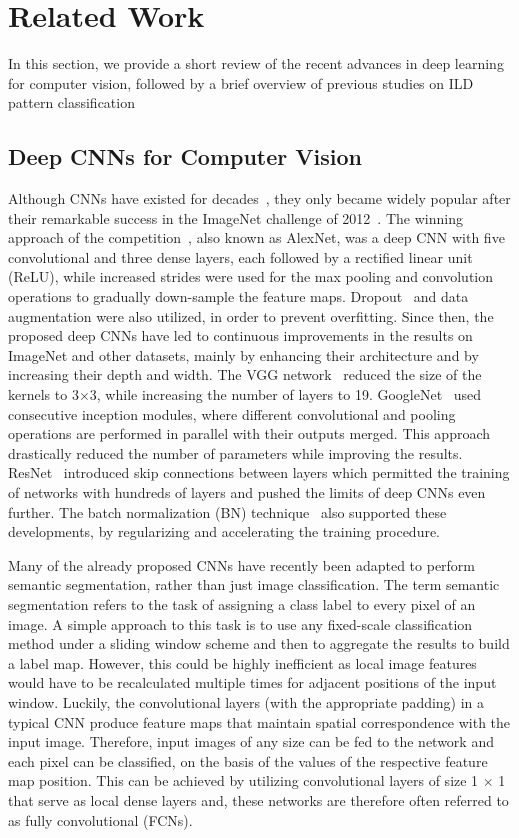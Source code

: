 \documentclass[journal]{IEEEtran}
\begin{document}
\section{Related Work}%
In this section, we provide a short review of the recent advances in deep learning for computer vision, followed by a brief overview of previous studies on ILD pattern classification

\subsection{Deep CNNs for Computer Vision}%
Although CNNs have existed for decades~\cite{lecun98}, they only became widely popular after their remarkable success in the ImageNet challenge of 2012~\cite{ILSVRC15}. The winning approach of the competition~\cite{krizhevsky2012imagenet}, also known as AlexNet, was a deep CNN with five convolutional and three dense layers, each followed by a rectified linear unit (ReLU), while increased strides were used for the max pooling and convolution operations to gradually down-sample the feature maps. Dropout~\cite{Dropout} and data augmentation were also utilized, in order to prevent overfitting. Since then, the proposed deep CNNs have led to continuous improvements in the results on ImageNet and other datasets, mainly by enhancing their architecture and by increasing their depth and width. The VGG network~\cite{simonyan2014very} reduced the size of the kernels to 3$\times$3, while increasing the number of layers to 19. GoogleNet~\cite{szegedy2015going} used consecutive inception modules, where different convolutional and pooling operations are performed in parallel with their outputs merged. This approach drastically reduced the number of parameters while improving the results. ResNet~\cite{he2016deep} introduced skip connections between layers which permitted the training of networks with hundreds of layers and pushed the limits of deep CNNs even further. The batch normalization (BN) technique~\cite{IoffeBN} also supported these developments, by regularizing and accelerating the training procedure.

Many of the already proposed CNNs have recently been adapted to perform semantic segmentation, rather than just image classification. The term semantic segmentation refers to the task of assigning a class label to every pixel of an image. A simple approach to this task is to use any fixed-scale classification method under a sliding window scheme and then to aggregate the results to build a label map. However, this could be highly inefficient as local image features would have to be recalculated multiple times for adjacent positions of the input window. Luckily, the convolutional layers (with the appropriate padding) in a typical CNN produce feature maps that maintain spatial correspondence with the input image. Therefore, input images of any size can be fed to the network and each pixel can be classified, on the basis of the values of the respective feature map position. This can be achieved by utilizing convolutional layers of size 1 $\times$ 1 that serve as local dense layers and, these networks are therefore often referred to as fully convolutional (FCNs). 
\end{document}
